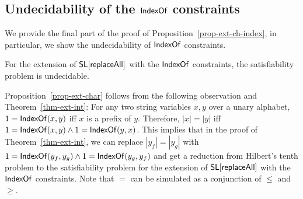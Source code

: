 %
%
%
%
 

\subsection{Undecidability of the $\mathsf{IndexOf}$ constraints}

We provide the final part of the proof of Proposition~\ref{prop-ext-ch-index}, in particular, we show the undecidability of $\mathsf{IndexOf}$ constraints.

\begin{proposition}\label{prop-indexof}
	For the extension of $\mathsf{SL}[\mathsf{replaceAll}]$ with the $\mathsf{IndexOf}$ constraints, the satisfiability problem is undecidable. 
\end{proposition}

Proposition~\ref{prop-ext-char} follows from the following observation and Theorem~\ref{thm-ext-int}: For any two string variables $x,y$ over a unary alphabet, 
$1= \mathsf{IndexOf}(x,y)$ iff $x$ is a prefix of $y$. Therefore, $|x| = |y|$ iff $1=  \mathsf{IndexOf}(x,y) \wedge 1= \mathsf{IndexOf}(y,x)$. This implies that in the proof of Theorem~\ref{thm-ext-int}, we can replace $|y_f| = |y_g|$ with $1=\mathsf{IndexOf}(y_f, y_g) \wedge 1 = \mathsf{IndexOf}(y_g, y_f)$ and get a reduction from Hilbert's tenth problem to the satisfiability problem for the extension of $\mathsf{SL}[\mathsf{replaceAll}]$ with the $\mathsf{IndexOf}$ constraints.
Note that $=$ can be simulated as a conjunction of $\leq$ and $\geq$.
 



